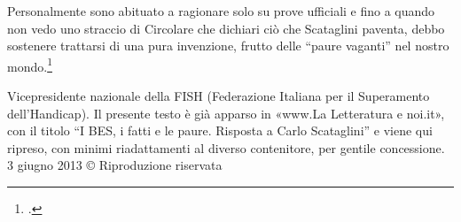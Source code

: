 Personalmente sono abituato a ragionare solo su prove ufficiali e fino a quando non vedo uno straccio di Circolare che dichiari ciò che Scataglini paventa, debbo sostenere trattarsi di una pura invenzione, frutto delle “paure vaganti” nel nostro mondo.\footcite{nocera2}



Vicepresidente nazionale della FISH (Federazione Italiana per il Superamento dell'Handicap). Il presente testo è già apparso in «www.La Letteratura e noi.it», con il titolo “I BES, i fatti e le paure. Risposta a Carlo Scataglini” e viene qui ripreso, con minimi riadattamenti al diverso contenitore, per gentile concessione.
3 giugno 2013
© Riproduzione riservata
 
 
